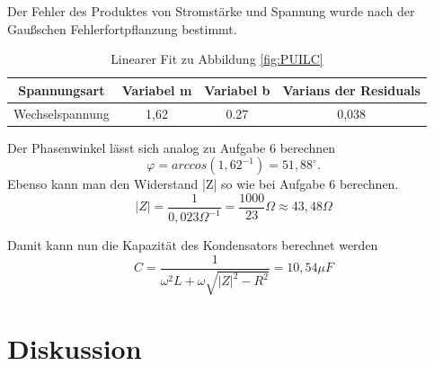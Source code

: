 Der Fehler des Produktes von Stromstärke und Spannung wurde nach der Gaußschen Fehlerfortpflanzung bestimmt.
\begin{table}[H]
  \centering
  \begin{tabular}{c | c | c | c}
    Spannungsart & Variabel m & Variabel b & Varians der Residuals\\ \hline
    Wechselspannung & 1,62 & 0.27 & 0,038
  \end{tabular}
  \caption{Linearer Fit zu Abbildung \ref{fig:PUILC}}
  \label{tab:fitPUILC}
\end{table}
Der Phasenwinkel lässt sich analog zu Aufgabe 6 berechnen
\begin{equation}
\varphi=arccos(1,62^{-1})=51,88^{\circ}.
\end{equation}
Ebenso kann man den Widerstand |Z| so wie bei Aufgabe 6 berechnen.
\begin{equation}
|Z|=\frac{1}{0,023\Omega^{-1}}=\frac{1000}{23}\Omega\approx 43,48\Omega
\end{equation}

Damit kann nun die Kapazität des Kondensators berechnet werden
\begin{equation}
C=\frac{1}{\omega^2L+\omega\sqrt{|Z|^2-R^2}}=10,54\mu F
\end{equation}
\section{Diskussion}

